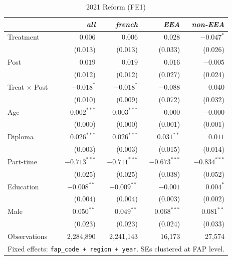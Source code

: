 \documentclass[10pt, a4paper]{article}
\begin{document}
\begin{table}[h!]
\caption{2021 Reform (FE1)\label{tab:did2021_fe1}}
\centering
\setlength{\tabcolsep}{25pt}
\begin{tabular}{lrrrr}
 & \textit{all} & \textit{french} & \textit{EEA} & \textit{non-EEA} \\
\midrule
\midrule
Treatment & $0.006$ & $0.006$ & $0.028$ & $-0.047^{*}$ \\
 & (0.013) & (0.013) & (0.033) & (0.026) \\[2pt]
Post & $0.019$ & $0.019$ & $0.016$ & $-0.005$ \\
 & (0.012) & (0.012) & (0.027) & (0.024) \\[2pt]
Treat$\,\times\,$Post & $-0.018^{*}$ & $-0.018^{*}$ & $-0.088$ & $0.040$ \\
 & (0.010) & (0.009) & (0.072) & (0.032) \\[2pt]
\midrule
Age & $0.002^{***}$ & $0.003^{***}$ & $-0.000$ & $-0.000$ \\
 & (0.000) & (0.000) & (0.001) & (0.001) \\[2pt]
Diploma & $0.026^{***}$ & $0.026^{***}$ & $0.031^{**}$ & $0.011$ \\
 & (0.003) & (0.003) & (0.015) & (0.014) \\[2pt]
Part-time & $-0.713^{***}$ & $-0.711^{***}$ & $-0.673^{***}$ & $-0.834^{***}$ \\
 & (0.025) & (0.025) & (0.038) & (0.052) \\[2pt]
Education & $-0.008^{**}$ & $-0.009^{**}$ & $-0.001$ & $0.004^{*}$ \\
 & (0.004) & (0.004) & (0.003) & (0.002) \\[2pt]
Male & $0.050^{**}$ & $0.049^{**}$ & $0.068^{***}$ & $0.081^{**}$ \\
 & (0.023) & (0.023) & (0.024) & (0.033) \\[2pt]
\midrule
Observations & 2{,}284{,}890 & 2{,}241{,}143 & 16{,}173 & 27{,}574 \\
\bottomrule
\multicolumn{5}{p{0.88\linewidth}}{\footnotesize Fixed effects: \texttt{fap\_code + region + year}. SEs clustered at FAP level.}\\
\end{tabular}
\end{table}
\end{document}
